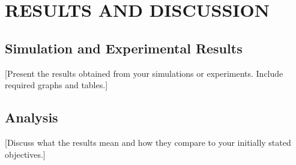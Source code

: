 \chapter{RESULTS AND DISCUSSION}
\label{chap:results}

\section{Simulation and Experimental Results}
[Present the results obtained from your simulations or experiments. Include required graphs and tables.]

\section{Analysis}
[Discuss what the results mean and how they compare to your initially stated objectives.]
